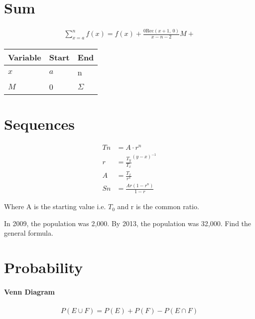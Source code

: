 \documentclass[11pt]{article}
\newcommand{\Rec}{\text{Rec}}
\begin{document}
    \section{Sum}\label{sec:sum}
    \begin{align}
        \sum_{x=a}^{n} f\left(x\right) =
        f(x) + \frac{0\Rec\left( x+1,~0\right)} {x -n -2} M+
    \end{align}

    \begin{center}
        \begin{tabular}{|l|l|l|}
            \hline
            Variable & Start & End      \\
            \hline
            $x$      & $a$   & n        \\
            \hline
            $M$      & 0     & $\Sigma$ \\
            \hline
        \end{tabular}
    \end{center}


    \section{Sequences}\label{sec:sequences}
    \begin{align}
        Tn &=  A \cdot r^n \\
        r &=  {\frac {T_y} {T_x} } ^ { \left( y-x \right) ^ {-1} }  \\
        A &= \frac {T_x} {r^x}  \\
        Sn &= \frac{ Ar \left( 1 - r^n \right) } { 1 - r }
    \end{align}

    Where A is the starting value i.e. $T_0$ and r is the common ratio.

    In 2009, the population was 2,000.
    By 2013, the population was 32,000.
    Find the general formula.


    \section{Probability}\label{sec:probability}

    \paragraph{Venn Diagram}
    \begin{align}
        P\left(E \cup F\right) = P\left(E\right) + P\left(F\right) - P\left(E \cap F\right)
    \end{align}
\end{document}
